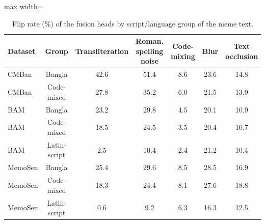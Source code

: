 \begin{table}[t]
\centering
\small
\caption{Flip rate (\%) of the fusion heads by script/language group of the meme text.}
\label{tab:cross_lang}
\begin{adjustbox}{max width=\columnwidth}
\begin{tabular}{lcccccc}
\toprule
Dataset & Group & Transliteration & Roman. spelling noise & Code-mixing & Blur & Text occlusion \\
\midrule
CMBan & Bangla & 42.6 & 51.4 & 8.6 & 23.6 & 14.8 \\
CMBan & Code-mixed & 27.8 & 35.2 & 6.0 & 21.5 & 13.9 \\
BAM & Bangla & 23.2 & 29.8 & 4.5 & 20.1 & 10.9 \\
BAM & Code-mixed & 18.5 & 24.5 & 3.5 & 20.4 & 10.7 \\
BAM & Latin-script & 2.5 & 10.4 & 2.4 & 21.2 & 10.4 \\
MemoSen & Bangla & 25.4 & 29.6 & 8.5 & 28.5 & 16.9 \\
MemoSen & Code-mixed & 18.3 & 24.4 & 8.1 & 27.6 & 18.8 \\
MemoSen & Latin-script & 0.6 & 9.2 & 6.3 & 16.3 & 12.5 \\
\bottomrule
\end{tabular}
\end{adjustbox}
\end{table}
